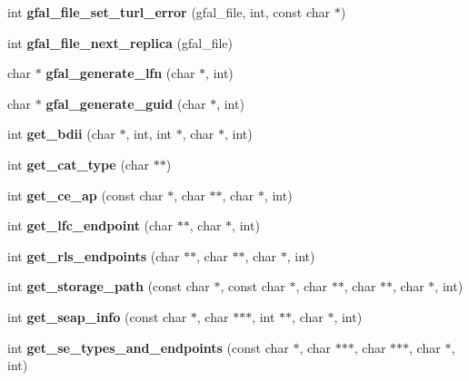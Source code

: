 \begin{CompactItemize}
\item 
int \textbf{gfal\_\-file\_\-set\_\-turl\_\-error} (gfal\_\-file, int, const char $\ast$)\label{group__internal__group_gafd5eb622406793e29b3aaf4d82ca399}

\item 
int \textbf{gfal\_\-file\_\-next\_\-replica} (gfal\_\-file)\label{group__internal__group_g6de434f3dc9aef814ca6d67c40febbbe}

\item 
char $\ast$ \textbf{gfal\_\-generate\_\-lfn} (char $\ast$, int)\label{group__internal__group_gcd48b57bf9659be5204319918c6f9d20}

\item 
char $\ast$ \textbf{gfal\_\-generate\_\-guid} (char $\ast$, int)\label{group__internal__group_g8311ede197e204e57029165fbc3898d6}

\item 
int \textbf{get\_\-bdii} (char $\ast$, int, int $\ast$, char $\ast$, int)\label{group__internal__group_g6a5e219ff3f38693631f8d70e96e0e08}

\item 
int \textbf{get\_\-cat\_\-type} (char $\ast$$\ast$)\label{group__internal__group_gc2d78167f7ce4514a07cc3e509584ccd}

\item 
int \textbf{get\_\-ce\_\-ap} (const char $\ast$, char $\ast$$\ast$, char $\ast$, int)\label{group__internal__group_g88f1afdfd6774bd93299b1972c0b1ce2}

\item 
int \textbf{get\_\-lfc\_\-endpoint} (char $\ast$$\ast$, char $\ast$, int)\label{group__internal__group_gc6910197c332ef4faf53fff9e028dc3a}

\item 
int \textbf{get\_\-rls\_\-endpoints} (char $\ast$$\ast$, char $\ast$$\ast$, char $\ast$, int)\label{group__internal__group_gda62dc4dfca4402c6da1fd2777a4ff26}

\item 
int \textbf{get\_\-storage\_\-path} (const char $\ast$, const char $\ast$, char $\ast$$\ast$, char $\ast$$\ast$, char $\ast$, int)\label{group__internal__group_g17d2b87d75003d27590884b57f264314}

\item 
int \textbf{get\_\-seap\_\-info} (const char $\ast$, char $\ast$$\ast$$\ast$, int $\ast$$\ast$, char $\ast$, int)\label{group__internal__group_g56daac54672781b617cee8813fc0e1c9}

\item 
int \textbf{get\_\-se\_\-types\_\-and\_\-endpoints} (const char $\ast$, char $\ast$$\ast$$\ast$, char $\ast$$\ast$$\ast$, char $\ast$, int)\label{group__internal__group_gf53006a28540ccc70306d72903ab4802}


\end{CompactItemize}
